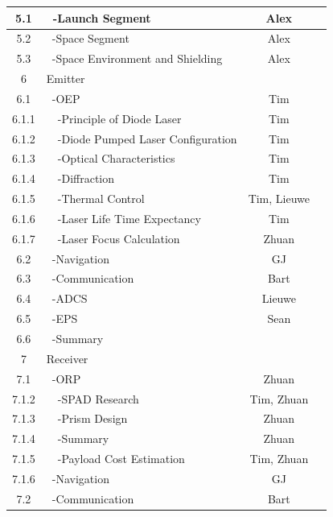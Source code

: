 \begin{table}[ht!]
{\begin{tabular}{|c|l|c|c|}
 5.1     & \ -Launch Segment                    & Alex &\\\hline
 5.2     & \ -Space Segment                     & Alex &\\\hline
 5.3     & \ -Space Environment and Shielding   & Alex &\\\hline\hline
 6       & Emitter                              &\\\hline
 6.1     & \ -OEP                               & Tim &\\\hline
 6.1.1   & \ \ -Principle of Diode Laser       & Tim &\\\hline
 6.1.2   & \ \ -Diode Pumped Laser Configuration & Tim &\\\hline
 6.1.3   & \ \ -Optical Characteristics        & Tim &\\\hline
 6.1.4   & \ \ -Diffraction                    & Tim &\\\hline  
 6.1.5   & \ \ -Thermal Control                & Tim, Lieuwe &\\\hline
 6.1.6   & \ \ -Laser Life Time Expectancy     & Tim &\\\hline
 6.1.7   & \ \ -Laser Focus Calculation        & Zhuan &\\\hline
 6.2     & \ -Navigation                        & GJ &\\\hline
 6.3     & \ -Communication                     & Bart &\\\hline
 6.4     & \ -ADCS                              & Lieuwe &\\\hline
 6.5     & \ -EPS                               & Sean &\\\hline
 6.6     & \ -Summary                           &\\\hline\hline
 7       & Receiver                             &\\\hline
 7.1     & \ -ORP                               & Zhuan &\\\hline
 7.1.2   & \ \ -SPAD Research                  & Tim, Zhuan &\\\hline
 7.1.3   & \ \ -Prism Design                   & Zhuan &\\\hline
 7.1.4   & \ \ -Summary                        & Zhuan &\\\hline
 7.1.5   & \ \ -Payload Cost Estimation        & Tim, Zhuan &\\\hline
 7.1.6   & \ -Navigation                        & GJ &\\\hline
 7.2     & \ -Communication                     & Bart &\\\hline

\end{tabular}}
\end{table}

